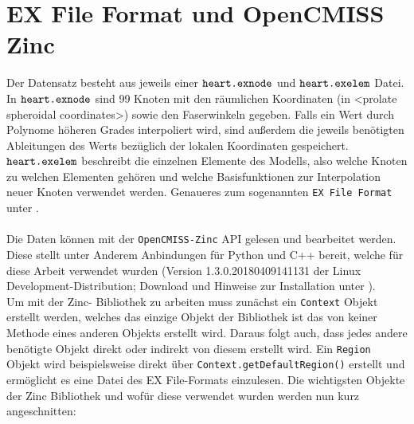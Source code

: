\documentclass[
	a4paper,			%
	11pt,				%
	headsepline,		%
	bibtotoc,			%
	BCOR18mm,      		%
	DIV14,				%
	headings=normal,
	numbers=noenddot,
]{scrbook}
\theoremstyle{mythmstyle}
\theoremstyle{other}
\begin{document}
	\section{EX File Format und OpenCMISS Zinc}
	Der Datensatz besteht aus jeweils einer $\verb!heart.exnode!$ und $\verb!heart.exelem!$ Datei.\\
	 In 
	$\verb!heart.exnode!$ 
	sind 99 Knoten mit den räumlichen Koordinaten (in <prolate spheroidal coordinates>) sowie den Faserwinkeln
	gegeben. Falls ein Wert durch Polynome höheren Grades interpoliert wird, sind außerdem die jeweils benötigten
	Ableitungen des Werts bezüglich der lokalen Koordinaten gespeichert.  \\
	$\verb!heart.exelem!$ beschreibt die einzelnen Elemente des Modells, also welche Knoten zu welchen Elementen
	gehören und welche Basisfunktionen zur Interpolation neuer Knoten verwendet werden. Genaueres zum 
	sogenannten \verb!EX File Format! unter \cite{exfile}. \\\\
	Die Daten können mit der \verb!OpenCMISS-Zinc! API gelesen und bearbeitet werden. Diese stellt unter Anderem
	Anbindungen für Python und C++ bereit, welche für diese Arbeit verwendet wurden (Version 1.3.0.20180409141131
	der Linux Development-Distribution; Download und Hinweise zur Installation unter 
	\cite{opencmiss-zinc-getting-started}).
		\\	
	Um mit der Zinc- Bibliothek zu arbeiten muss
	 zunächst ein \verb!Context! Objekt erstellt werden, welches das einzige Objekt
	der Bibliothek ist das von keiner Methode eines anderen Objekts erstellt wird. Daraus folgt auch, dass
	jedes andere benötigte Objekt direkt oder indirekt von diesem  erstellt wird. Ein \verb!Region! Objekt
	wird beispielsweise direkt über \verb!Context.getDefaultRegion()! erstellt und ermöglicht es eine
	Datei des EX File-Formats einzulesen. Die wichtigsten Objekte der Zinc Bibliothek und wofür diese verwendet 
	 wurden werden nun
	kurz angeschnitten:
	
\end{document}
